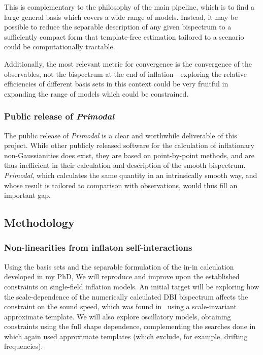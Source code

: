 This is complementary to the philosophy of the main pipeline,
which is to find a large general basis which covers a wide range of models.
Instead, it may be possible to reduce the separable description of any given
bispectrum to a sufficiently compact form that template-free estimation
tailored to a scenario could be computationally tractable.

Additionally, the most relevant metric for convergence is the convergence of
the observables, not the bispectrum at the end of inflation---exploring the
relative efficiencies of different basis sets in this context could be very
fruitful in expanding the range of models which could be constrained.

\subsubsection{Public release of \textit{Primodal}}
The public release of \textit{Primodal} is a clear and worthwhile
deliverable of this project. While other publicly released software
for the calculation of inflationary non-Gaussianities does exist,
they are based on point-by-point methods, and are thus inefficient
in their calculation and description of the smooth bispectrum.
\textit{Primodal}, which calculates the same quantity in an intrinsically
smooth way, and whose result is tailored to comparison with observations,
would thus fill an important gap.

\subsection{Methodology}
\subsubsection{Non-linearities from inflaton self-interactions}
Using the basis sets and the separable formulation of the in-in calculation developed in my PhD,
We will reproduce and improve upon the established constraints on single-field inflation models.
An initial target will be exploring how the scale-dependence of the numerically calculated DBI bispectrum
affects the constraint on the sound speed, which was found in~\cite{Planck_NG_2018}
using a scale-invariant approximate template. We will also explore oscillatory models,
obtaining constraints using the full shape dependence, complementing the
searches done in~\cite{Planck_NG_2018} which again used approximate templates
(which exclude, for example, drifting frequencies).

